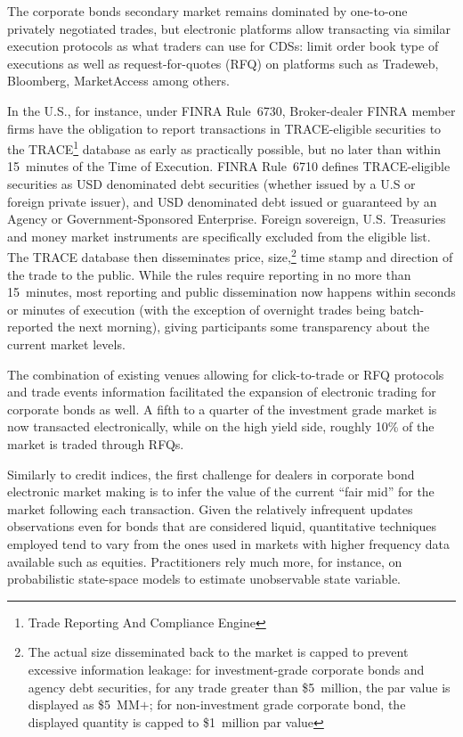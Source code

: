 The corporate bonds secondary market remains dominated by one-to-one privately negotiated trades, but electronic platforms allow transacting via similar execution protocols as what traders can use for CDSs: limit order book type of executions as well as request-for-quotes (RFQ) on platforms such as Tradeweb, Bloomberg, MarketAccess among others.


In the U.S., for instance, under FINRA Rule~6730, Broker-dealer FINRA member firms have the obligation to report transactions in TRACE-eligible securities to the TRACE\footnote{Trade Reporting And Compliance Engine} database as early as practically possible, but no later than within 15~minutes of the Time of Execution. FINRA Rule~6710 defines TRACE-eligible securities as USD denominated debt securities (whether issued by a U.S or foreign private issuer), and USD denominated debt issued or guaranteed by an Agency or Government-Sponsored Enterprise. Foreign sovereign, U.S. Treasuries and money market instruments are specifically excluded from the eligible list. The TRACE database then disseminates price, size,\footnote{The actual size disseminated back to the market is capped to prevent excessive information leakage: for investment-grade corporate bonds and agency debt securities, for any trade greater than \$5~million, the par value is displayed as \$5~MM$+$; for non-investment grade corporate bond, the displayed quantity is capped to \$1~million par value} time stamp and direction of the trade to the public. While the rules require reporting in no more than 15~minutes, most reporting and public dissemination now happens within seconds or minutes of execution (with the exception of overnight trades being batch-reported the next morning), giving participants some transparency about the current market levels.


The combination of existing venues allowing for click-to-trade or RFQ protocols and trade events information facilitated the expansion of electronic trading for corporate bonds as well. A fifth to a quarter of the investment grade market is now transacted electronically, while on the high yield side, roughly 10\% of the market is traded through RFQs.


Similarly to credit indices, the first challenge for dealers in corporate bond electronic market making is to infer the value of the current ``fair mid'' for the market following each transaction. Given the relatively infrequent updates observations even for bonds that are considered liquid, quantitative techniques employed tend to vary from the ones used in markets with higher frequency data available such as equities. Practitioners rely much more, for instance, on probabilistic state-space models to estimate unobservable state variable.


